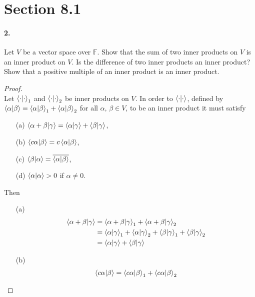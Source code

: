 \documentclass{article}
\theoremstyle{plain}
\theoremstyle{definition}
\theoremstyle{remark}
\newcommand{\Fi}{\mathbb{F}}
\begin{document}
  \section*{Section 8.1}

    \paragraph{2.}
    Let $V$ be a vector space over $\Fi$. Show that the sum of two inner products on $V$ is an inner product on $V$. Is the difference of two inner products an inner product? Show that a positive multiple of an inner product is an inner product.
      \begin{proof}$ $\\
        Let $\braket{\cdot}{\cdot}_1$ and $\braket{\cdot}{\cdot}_2$ be inner products on $V$. In order to $\braket{\cdot}{\cdot}$, defined by $\braket{\alpha}{\beta} =\braket{\alpha}{\beta}_1+ \braket{\alpha}{\beta}_2$ for all $\alpha, \, \beta \in V$, to be an inner product it must satisfy
        \begin{itemize}
          \item[(a)] $\braket{\alpha + \beta}{\gamma} = \braket{\alpha}{\gamma} +\braket{\beta}{\gamma}$,
          \item[(b)] $\braket{c\alpha}{\beta}=c\braket{\alpha}{\beta}$,
          \item[(c)] $\braket{\beta}{\alpha}= \overline{\braket{\alpha}{\beta}}$,
          \item[(d)] $\braket{\alpha}{\alpha}>0$ if $\alpha \neq 0$.
        \end{itemize}
        Then
        \begin{itemize}
          \item[(a)]
            \begin{align*}
              \braket{\alpha + \beta}{\gamma} & = \braket{\alpha + \beta}{\gamma}_1 + \braket{\alpha + \beta}{\gamma}_2\\
                                              & = \braket{\alpha}{\gamma}_1 + \braket{\alpha}{\gamma}_2 + \braket{\beta}{\gamma}_1 + \braket{\beta}{\gamma}_2\\
                                              & = \braket{\alpha}{\gamma} +\braket{\beta}{\gamma}
            \end{align*}
          \item[(b)]
            \begin{align*}
              \braket{c\alpha}{\beta}   & = \braket{c\alpha}{\beta}_1 + \braket{c\alpha}{\beta}_2\\

\end{align*}
\end{itemize}
\end{proof}
\end{document}
